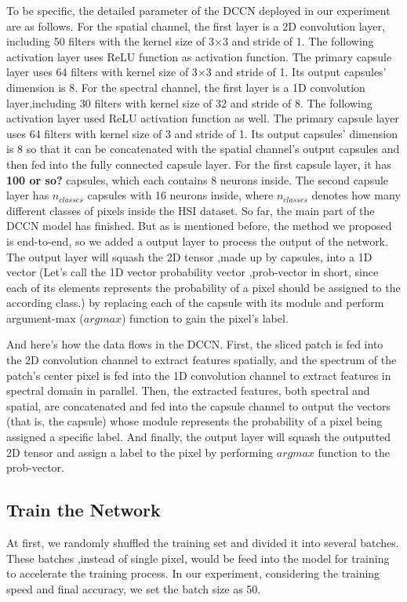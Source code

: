 \documentclass{article}
\begin{document}
	To be specific, the detailed parameter of the DCCN deployed in our experiment are as follows.
	For the spatial channel, the first layer is a 2D convolution layer, including 50 filters with the kernel size of
	3×3 and stride of 1.
	The following activation layer uses ReLU function as activation function.
	The primary capsule layer uses 64 filters with kernel size of 3×3 and stride of 1.
	Its output capsules' dimension is 8.
	For the spectral channel, the first layer is a 1D convolution layer,including 30 filters with kernel size of 32 and
	stride of 8.
	The following activation layer used ReLU activation function as well.
	The primary capsule layer uses 64 filters with kernel size of 3 and stride of 1.
	Its output capsules' dimension is 8 so that it can be concatenated with the spatial channel's output capsules and
	then fed into the fully connected capsule layer.
	For the first capsule layer, it has \textbf{100 or so?} capsules, which each contains 8 neurons inside.
	The second capsule layer has $n_{classes}$ capsules with 16 neurons inside, where $n_{classes}$ denotes how many
	different classes of pixels inside the HSI dataset.
	So far, the main part of the DCCN model has finished.
	But as is mentioned before, the method we proposed is end-to-end, so we added a output layer to process the output
	of the network.
	The output layer will squash the 2D tensor ,made up by capsules, into a 1D vector (Let's call the 1D vector
	probability vector ,prob-vector in short, since each of its elements represents the probability of a pixel should
	be assigned to the according class.) by replacing each of the capsule with its module and perform argument-max
	($argmax$) function to gain the pixel's label.


	And here's how the data flows in the DCCN.
	First, the sliced patch is fed into the 2D convolution channel to extract features spatially, and the spectrum
	of the patch's center pixel is fed into the 1D convolution channel to extract features in spectral domain in
	parallel.
	Then, the extracted features, both spectral and spatial, are concatenated and fed into the capsule channel to output
	the vectors (that is, the capsule) whose module represents the probability of a pixel being assigned a specific
	label.
	And finally, the output layer will squash the outputted 2D tensor and assign a label to the pixel by performing
	$argmax$ function to the prob-vector.

	\subsection{Train the Network}\label{subsec:train-the-network}
	At first, we randomly shuffled the training set and divided it into several batches.
	These batches ,instead of single pixel, would be feed into the model for training to accelerate the training process.
	In our experiment, considering the training speed and final accuracy, we set the batch size as 50.
\end{document}

